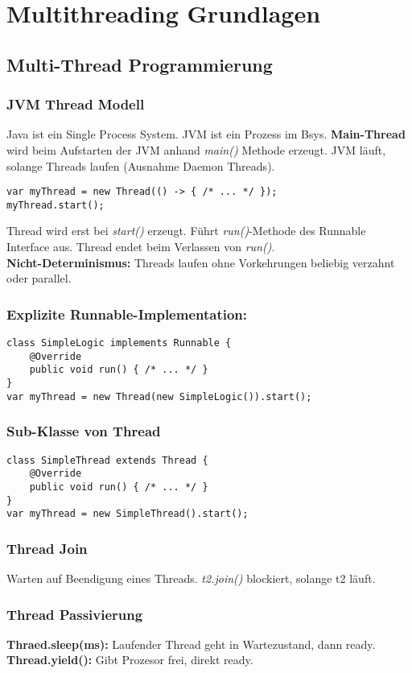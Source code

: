 
\section{Multithreading Grundlagen}
\subsection{Multi-Thread Programmierung}
\subsubsection{JVM Thread Modell}
Java ist ein Single Process System. 
JVM ist ein Prozess im Bsys.
\textbf{Main-Thread} wird beim Aufstarten der JVM anhand \textit{main()} Methode erzeugt.
JVM läuft, solange Threads laufen (Ausnahme Daemon Threads).
\begin{lstlisting}
var myThread = new Thread(() -> { /* ... */ });
myThread.start();
\end{lstlisting}
Thread wird erst bei \textit{start()} erzeugt. Führt \textit{run()}-Methode des Runnable Interface aus.
Thread endet beim Verlassen von \textit{run()}.\\
\textbf{Nicht-Determinismus:} Threads laufen ohne Vorkehrungen beliebig verzahnt oder parallel.
\subsubsection{Explizite Runnable-Implementation:}
\begin{lstlisting}
class SimpleLogic implements Runnable {
    @Override
    public void run() { /* ... */ }
}
var myThread = new Thread(new SimpleLogic()).start();
\end{lstlisting}

\subsubsection{Sub-Klasse von Thread}
\begin{lstlisting}
class SimpleThread extends Thread {
    @Override 
    public void run() { /* ... */ }
}
var myThread = new SimpleThread().start();
\end{lstlisting}

\subsubsection{Thread Join}
Warten auf Beendigung eines Threads. \textit{t2.join()} blockiert, solange t2 läuft.

\subsubsection{Thread Passivierung}
\textbf{Thraed.sleep(ms):} Laufender Thread geht in Wartezustand, dann ready.
\textbf{Thread.yield():} Gibt Prozesor frei, direkt ready.